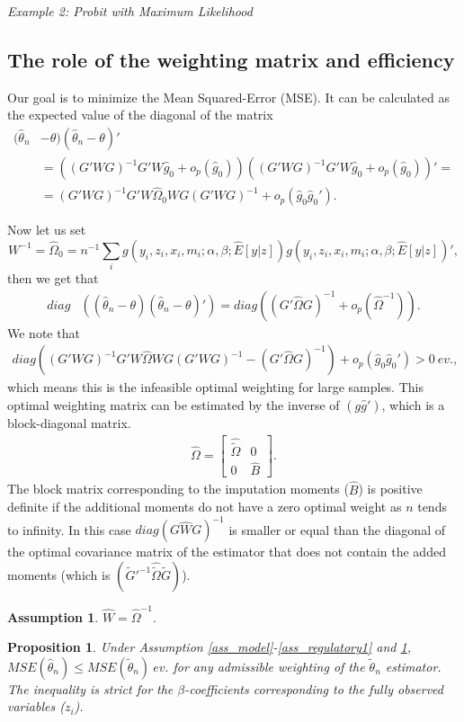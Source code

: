 \documentclass{article}
\newtheorem{assumption}{Assumption}
\newtheorem{proposition}{Proposition}
\theoremstyle{definition}
\theoremstyle{remark}
\begin{document}
\emph{Example 2: Probit with Maximum Likelihood}


\subsection{The role of the weighting matrix and efficiency}
Our goal is to minimize the Mean Squared-Error (MSE). It can be calculated as the expected value of the diagonal of the matrix
\begin{align}
(\hat{\theta}_n &-\theta)(\hat{\theta}_n -\theta)' \\
&=((G'WG)^{-1}G'W \hat{g}_0 + o_p(\hat{g}_0))((G'WG)^{-1}G'W \hat{g}_0 + o_p(\hat{g}_0))'= \nonumber \\
&= (G'WG)^{-1} G'W \hat{\Omega}_0 W G (G'WG)^{-1}  + o_p(\hat{g}_0\hat{g}_0'). \nonumber
\end{align}

Now let us set
\[W^{-1}=\hat{\Omega}_0=n^{-1}\sum_i g(y_i,z_i,x_i,m_i; \alpha,\beta; \hat{E}[y|z]) g(y_i,z_i,x_i,m_i; \alpha,\beta; \hat{E}[y|z])',
\]
then we get that
\begin{align}
diag&\left((\hat{\theta}_n -\theta)(\hat{\theta}_n -\theta)'\right)= diag\left((G'\hat{\Omega} G)^{-1} + o_p(\hat{\Omega}^{-1})\right).
\end{align}
We note that
\begin{align*}
diag\left((G'WG)^{-1} G'W \hat{\Omega}W G (G'WG)^{-1}-  (G'\hat{\Omega} G)^{-1}\right) + o_p(\hat{g}_0\hat{g}_0')> 0 \ ev.,
\end{align*}
which means this is the infeasible optimal weighting for large samples. This optimal weighting matrix can be estimated by the inverse of $(g\hat{g}')$, which is a block-diagonal matrix.
\begin{align}
\hat{\Omega} = \left[\begin{array}{cc}
\hat{\tilde{\Omega}} & 0 \\ 0 & \hat{B}
\end{array}\right].
\end{align}
The block matrix corresponding to the imputation moments ($\hat{B}$) is positive definite if the additional moments do not have a zero optimal weight as $n$ tends to infinity. In this case $diag(G\hat{W}G)^{-1}$ is smaller or equal than the diagonal of the optimal covariance matrix of the estimator that does not contain the added moments (which is $(\tilde{G}'^{-1}\hat{\tilde{\Omega}} \tilde{G})$).
\begin{assumption}\label{ass_optimalWeighting}
	$\hat{W} = \hat{\Omega}^{-1}.$
\end{assumption}
\begin{proposition}
	Under Assumption \ref{ass_model}-\ref{ass_regulatory1} and \ref{ass_optimalWeighting}, $MSE(\hat{\theta}_n)\leq MSE(\tilde{\theta}_n) \ ev.$ for any admissible weighting of the $\tilde{\theta}_n$ estimator. The inequality is strict for the $\beta$-coefficients corresponding to the fully observed variables ($z_i$).
\end{proposition}
\end{document}
